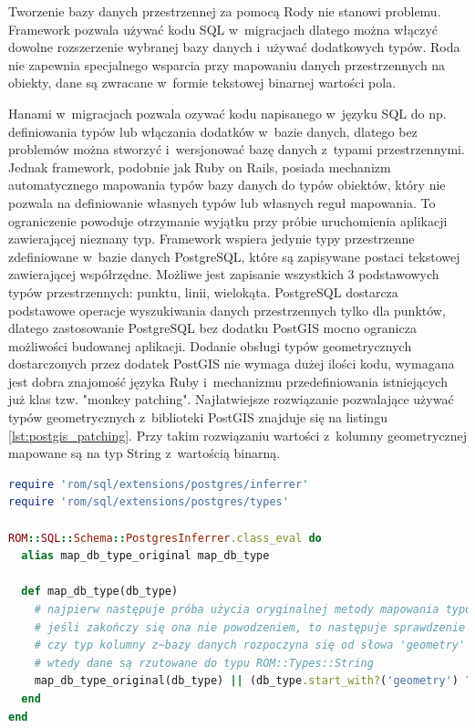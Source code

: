 \documentclass[printmode]{mgr}
\begin{document}
 Tworzenie bazy danych przestrzennej za pomocą Rody nie stanowi problemu. Framework pozwala używać kodu SQL w~migracjach dlatego można włączyć dowolne rozszerzenie wybranej bazy danych i~używać dodatkowych typów. Roda nie zapewnia specjalnego wsparcia przy mapowaniu danych przestrzennych na obiekty, dane są zwracane w~formie tekstowej binarnej wartości pola.

 Hanami w~migracjach pozwala ozywać kodu napisanego w~języku SQL do np. definiowania typów lub włączania dodatków w~bazie danych, dlatego bez problemów można stworzyć i~wersjonować bazę danych z~typami przestrzennymi. Jednak framework, podobnie jak Ruby on Rails, posiada mechanizm automatycznego mapowania typów bazy danych do typów obiektów, który nie pozwala na definiowanie własnych typów lub własnych reguł mapowania. To ograniczenie powoduje otrzymanie wyjątku przy próbie uruchomienia aplikacji zawierającej nieznany typ. Framework wspiera jedynie typy przestrzenne zdefiniowane w~bazie danych PostgreSQL, które są zapisywane postaci tekstowej zawierającej współrzędne. Możliwe jest zapisanie wszystkich 3 podstawowych typów przestrzennych: punktu, linii, wielokąta. PostgreSQL dostarcza podstawowe operacje wyszukiwania danych przestrzennych tylko dla punktów, dlatego zastosowanie PostgreSQL bez dodatku PostGIS mocno ogranicza możliwości budowanej aplikacji. Dodanie obsługi typów geometrycznych dostarczonych przez dodatek PostGIS nie wymaga dużej ilości kodu, wymagana jest dobra znajomość języka Ruby i~mechanizmu przedefiniowania istniejących już klas tzw. "monkey patching". Najłatwiejsze rozwiązanie pozwalające używać typów geometrycznych z~biblioteki PostGIS znajduje się na listingu \ref{lst:postgis_patching}. Przy takim rozwiązaniu wartości z~kolumny geometrycznej mapowane są na typ String z~wartością binarną.

 \newpage

\begin{lstlisting}[language=Ruby, caption={Obsługa typów geometrycznych z~biblioteki PostGIS przez Hanami}, label=lst:postgis_patching]
require 'rom/sql/extensions/postgres/inferrer'
require 'rom/sql/extensions/postgres/types'

ROM::SQL::Schema::PostgresInferrer.class_eval do
  alias map_db_type_original map_db_type

  def map_db_type(db_type)
    # najpierw następuje próba użycia oryginalnej metody mapowania typów
    # jeśli zakończy się ona nie powodzeniem, to następuje sprawdzenie 
    # czy typ kolumny z~bazy danych rozpoczyna się od słowa 'geometry'
    # wtedy dane są rzutowane do typu ROM::Types::String
    map_db_type_original(db_type) || (db_type.start_with?('geometry') ? ROM::Types::String : nil)
  end
end
\end{lstlisting}
\end{document}
